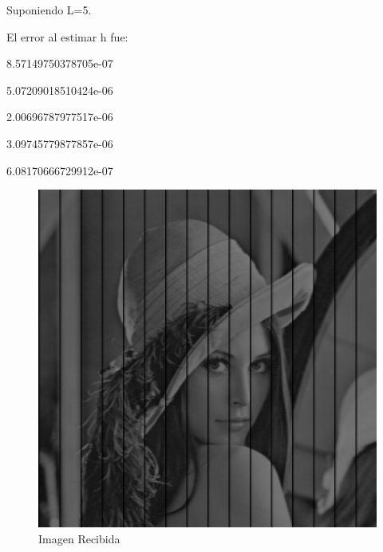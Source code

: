 \documentclass{article}
\begin{document}
\begin{multicols}{2}
\begin{figure}[H]
\end{figure}





\par \large{Suponiendo L=5.}

\par El error al estimar h fue:\\ 
\par   8.57149750378705e-07
\par   5.07209018510424e-06
\par   2.00696787977517e-06
\par   3.09745779877857e-06
\par   6.08170666729912e-07\\



\begin{figure}[H]
\centering
\includegraphics[scale=0.2]{../img/received_part5c.png}
\caption{Imagen Recibida}

\end{figure}


\end{multicols}
\end{document}
